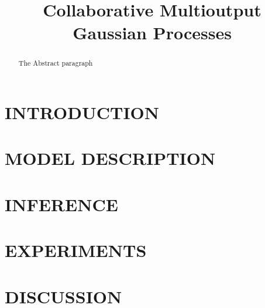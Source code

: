 \documentclass[]{article}
\title{Collaborative Multioutput Gaussian Processes}
\author{} %
\begin{document}
\maketitle

\begin{abstract}
The Abstract paragraph 
\end{abstract}

\section{INTRODUCTION}


\section{MODEL DESCRIPTION}


\section{INFERENCE}


\section{EXPERIMENTS}


\section{DISCUSSION}





\end{document}
